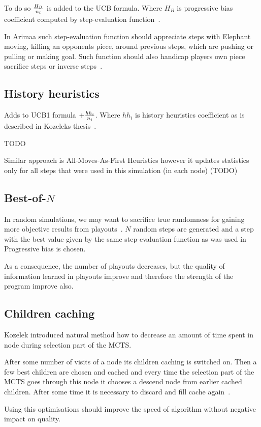 To do so ${H_B \over n_i}$ is added to the UCB formula. Where $H_B$ is
progressive bias coefficient computed by step-evaluation
function~\cite{progressive-strategies}.

In Arimaa such step-evaluation function should appreciate steps with Elephant
moving, killing an opponents piece, around previous steps, which are pushing or
pulling or making goal. Such function should also handicap players own piece
sacrifice steps or inverse steps~\cite{KOZELEK}.

\subsection{History heuristics}
Adds to UCB1 formula $+ {hh_i \over n_i}$. Where $hh_i$ is history
heuristics coefficient as is described in Kozeleks thesis~\cite{KOZELEK}.

TODO

Similar approach is All-Moves-As-First Heuristics however it updates statistics
only for all steps that were used in this simulation (in each node) (TODO)

\subsection{Best-of-$N$}
In random simulations, we may want to sacrifice true randomness for gaining
more objective results from playouts~\cite{HeavyPlayouts}. $N$ random steps are
generated and a step with the best value given by the same step-evaluation
function as was used in Progressive bias is chosen.

As a consequence, the number of playouts decreases, but the quality of
information learned in playouts improve and therefore the strength of the
program improve also.

\subsection{Children caching}
Kozelek introduced natural method how to decrease an amount of time spent in
node during selection part of the MCTS.

After some number of visits of a node its children caching is switched on. Then
a few best children are chosen and cached and every time the selection part of
the MCTS goes through this node it chooses a descend node from earlier cached
children. After some time it is necessary to discard and fill cache
again~\cite{KOZELEK}.

Using this optimisations should improve the speed of algorithm without negative
impact on quality.

